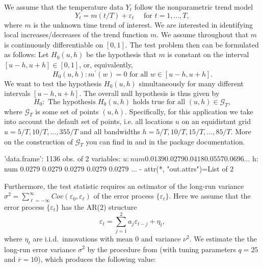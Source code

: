 \documentclass[a4paper]{scrartcl}
\begin{document}
We assume that the temperature data $Y_{t}$ follow the nonparametric trend model
\begin{equation*}
Y_{t} = m(t/T) + \varepsilon_t \quad \text{ for } t = 1, \ldots, T,
\end{equation*}
where $m$ is the unknown time trend of interest. We are interested in identifying local increases/decreases of the trend function $m$. We assume throughout that $m$ is continuously differentiable on $[0,1]$. The test problem then can be formulated as follows: Let $H_0(u,h)$ be the hypothesis that $m$ is constant on the interval $[u-h,u+h] \in [0, 1]$, or, equivalently,
\[ H_0(u,h): m^\prime(w) = 0 \text { for all } w \in [u-h,u+h]. \]
We want to test the hypothesis $H_0(u,h)$ simultaneously for many different intervals $[u-h,u+h]$. The overall null hypothesis is thus given by
\[ H_0: \text{ The hypothesis } H_0(u,h) \text{ holds true for all } (u,h) \in \mathcal{G}_T, \]
where $\mathcal{G}_T$ is some set of points $(u,h)$. Specifically, for this application we take into account the default set of points, i.e. all locations $u$ on an equidistant grid \linebreak $u = 5/T, 10/T, \ldots, 355/T$ and all bandwidths $h=5/T, 10/T, 15/T,\ldots, 85/T$. More on the construction of $\mathcal{G}_T$ you can find in \cite{KhismatullinaVogt2020} and in the package documentation.

\begin{Schunk}
\begin{Soutput}
'data.frame':	1136 obs. of  2 variables:
 $ u: num  0.0139 0.0279 0.0418 0.0557 0.0696 ...
 $ h: num  0.0279 0.0279 0.0279 0.0279 0.0279 ...
 - attr(*, "out.attrs")=List of 2
\end{Soutput}
\end{Schunk}

Furthermore, the test statistic requires an estimator of the long-run variance \linebreak $\sigma^2 = \sum_{\ell=-\infty}^{\infty} Cov(\varepsilon_0, \varepsilon_{\ell})$ of the error process $\{ \varepsilon_t \}$. Here we assume that the error process $\{ \varepsilon_t \}$ has the AR($2$) structure
\begin{equation*}
\varepsilon_t = \sum_{j=1}^{2} a_j \varepsilon_{t-j} + \eta_t,
\end{equation*}
where $\eta_t$ are i.i.d.\ innovations with mean $0$ and variance $\nu^2$. We estimate the the long-run error variance $\sigma^2$ by the procedure from \cite{KhismatullinaVogt2020} (with tuning parameters $q = 25$ and $ = 10$), which produces the following value:
\end{document}
